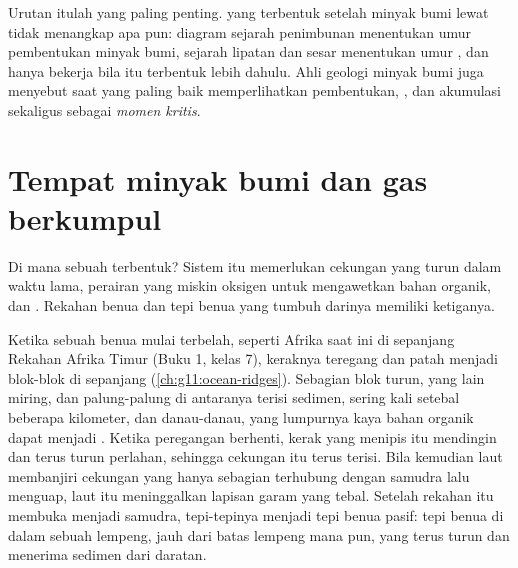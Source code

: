 Urutan itulah yang paling penting.  yang terbentuk setelah minyak bumi
lewat tidak menangkap apa pun: diagram sejarah penimbunan menentukan umur
pembentukan minyak bumi, sejarah lipatan dan sesar menentukan umur ,
dan  hanya bekerja bila  itu terbentuk lebih dahulu.
Ahli geologi minyak bumi juga menyebut saat yang paling baik memperlihatkan
pembentukan, , dan akumulasi sekaligus sebagai \emph{momen kritis}.

\section{Tempat minyak bumi dan gas berkumpul}

Di mana sebuah  terbentuk? Sistem itu memerlukan cekungan yang
turun dalam waktu lama, perairan yang miskin oksigen untuk mengawetkan bahan
organik, dan . Rekahan benua dan tepi benua yang tumbuh darinya
memiliki ketiganya.

Ketika sebuah benua mulai terbelah, seperti Afrika saat ini di sepanjang
Rekahan Afrika Timur (Buku 1, kelas 7), keraknya teregang dan patah menjadi
blok-blok di sepanjang  (\cref{ch:g11:ocean-ridges}). Sebagian blok
turun, yang lain miring, dan palung-palung di antaranya terisi sedimen, sering
kali setebal beberapa kilometer, dan danau-danau, yang lumpurnya kaya bahan
organik dapat menjadi . Ketika
peregangan berhenti, kerak yang menipis itu mendingin dan terus turun perlahan,
sehingga cekungan itu terus terisi. Bila kemudian laut membanjiri cekungan yang
hanya sebagian terhubung dengan samudra lalu menguap, laut itu meninggalkan
lapisan garam yang tebal. Setelah rekahan itu membuka menjadi samudra,
tepi-tepinya menjadi tepi benua pasif: tepi benua di dalam sebuah lempeng, jauh
dari batas lempeng mana pun, yang terus turun dan menerima sedimen dari
daratan.

